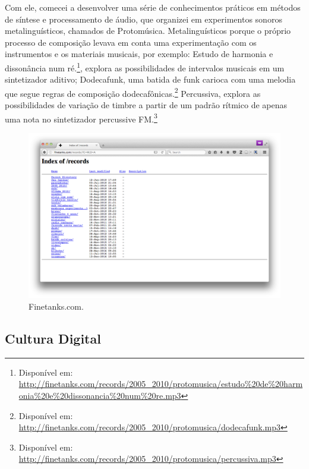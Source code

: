 Com ele, comecei a desenvolver uma série de conhecimentos práticos em métodos de síntese e processamento de áudio, que organizei em experimentos sonoros metalinguísticos, chamados de Protomúsica. Metalinguísticos porque o próprio processo de composição levava em conta uma experimentação com os instrumentos e os materiais musicais, por exemplo:
Estudo de harmonia e dissonância num ré.\footnote{Disponível em: \url{http://finetanks.com/records/2005_2010/protomusica/estudo\%20de\%20harmonia\%20e\%20dissonancia\%20num\%20re.mp3}}, explora as possibilidades de intervalos musicais em um sintetizador aditivo;
Dodecafunk, uma batida de funk carioca com uma melodia que segue regras de composição dodecafônicas.\footnote{Disponível em: \url{http://finetanks.com/records/2005_2010/protomusica/dodecafunk.mp3}}
Percussiva, explora as possibilidades de variação de timbre a partir de um padrão rítmico de apenas uma nota no sintetizador percussive FM.\footnote{Disponível em: \url{http://finetanks.com/records/2005_2010/protomusica/percussiva.mp3}}



\begin{figure}

\includegraphics[width=1\textwidth]{pictures/cap1/finetanksrecords}
\caption{Finetanks.com.}
\label{fig:finetanks}
\end{figure}




\subsection{Cultura Digital}

